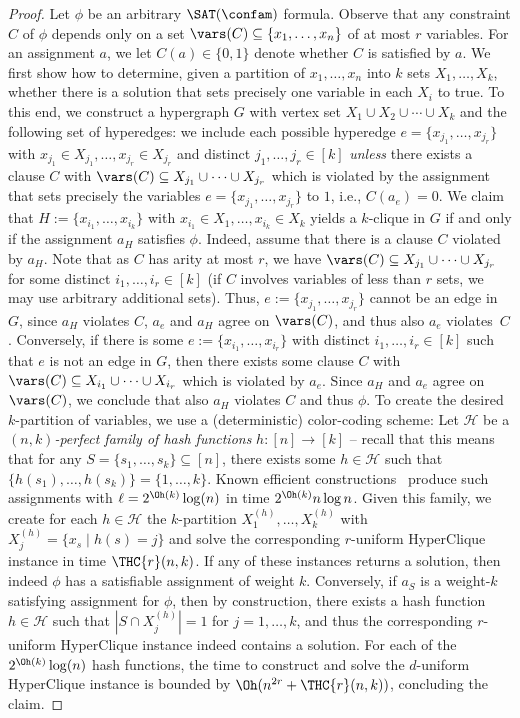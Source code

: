 \begin{proof}
Let $\phi$ be an arbitrary $\SAT(\confam)$ formula. Observe that any constraint $C$ of $\phi$ depends only on a set $\vars(C)\subseteq \{x_1,\dots,x_n\}$ of at most $r$ variables. For an assignment $a$, we let $C(a)\in \{0,1\}$ denote whether $C$ is satisfied by $a$.
%
We first show how to determine, given a partition of $x_1, \dots, x_n$ into $k$ sets $X_1,\dots, X_k$, whether there is a solution that sets precisely one variable in each $X_i$ to true. To this end, we construct a hypergraph $G$ with vertex set $X_1 \cup X_2 \cup \cdots \cup X_k$ and the following set of hyperedges: we include each possible hyperedge $e=\{x_{j_1}, \dots, x_{j_r}\}$ with $x_{j_1}\in X_{j_1}, \dots, x_{j_r} \in X_{j_r}$ and distinct $j_1, \dots, j_r\in [k]$ \emph{unless} there exists a clause $C$ with $\vars(C) \subseteq X_{j_1} \cup \cdots \cup X_{j_r}$ which is violated by the assignment that sets precisely the variables $e=\{x_{j_1}, \dots, x_{j_r}\}$ to $1$, i.e., $C(a_{e}) = 0$.
%
We claim that $H := \{x_{i_1}, \dots, x_{i_{k}}\}$ with  $x_{i_1} \in X_1, \dots, x_{i_k} \in X_k$ yields a $k$-clique in $G$ if and only if the assignment $a_{H}$ satisfies $\phi$. Indeed, assume that there is a clause $C$ violated by $a_{H}$. Note that as $C$ has arity at most $r$, we have $\vars(C) \subseteq X_{j_1} \cup \cdots \cup X_{j_r}$ for some distinct $i_1, \dots, i_r \in [k]$ (if $C$ involves variables of less than $r$ sets, we may use arbitrary additional sets). Thus, $e:=\{x_{j_1}, \dots, x_{j_r}\}$ cannot be an edge in $G$, since $a_H$ violates $C$, $a_e$ and $a_H$ agree on $\vars(C)$, and thus also $a_{e}$ violates~$C$. Conversely, if there is some $e:= \{x_{i_1}, \dots, x_{i_r}\}$ with distinct $i_1, \dots, i_r \in [k]$ such that $e$ is not an edge in $G$, then there exists some clause $C$ with $\vars(C) \subseteq X_{i_1} \cup \dots \cup X_{i_r}$ which is violated by $a_e$. Since $a_H$ and $a_e$ agree on $\vars(C)$, we conclude that also $a_H$ violates $C$ and thus $\phi$.
%
To create the desired $k$-partition of variables, we use a (deterministic) color-coding scheme: Let $\mathcal{H}$ be a \emph{$(n,k)$-perfect family of hash functions} $h : [n]\to [k]$ -- recall that this means that for any $S=\{s_1,\dots, s_k\}\subseteq [n]$, there exists some $h\in \mathcal{H}$ such that $\{h(s_1),\dots, h(s_k)\} = \{1,\dots, k\}$. Known efficient constructions~\cite{SchmidtS90, AlonYZ95} produce such assignments with $\ell = 2^{\Oh(k)}\log(n)$ in time $2^{\Oh(k)}n \log n$. Given this family, we create for each $h \in \mathcal{H}$ the $k$-partition $X^{(h)}_1, \dots, X^{(h)}_k$ with $X^{(h)}_j = \{ x_{s} \mid h(s) = j\}$ and solve the corresponding $r$-uniform HyperClique instance in time $\THC{r}(n,k)$. If any of these instances returns a solution, then indeed $\phi$ has a satisfiable assignment of weight $k$. Conversely, if $a_S$ is a weight-$k$ satisfying assignment for $\phi$, then by construction, there exists a hash function $h \in \mathcal{H}$ such that $|S\cap X^{(h)}_j|=1$ for $j=1,\dots, k$, and thus the corresponding $r$-uniform HyperClique instance indeed contains a solution. For each of the $2^{\Oh(k)}\log(n)$ hash functions, the time to construct and solve the $d$-uniform HyperClique instance is bounded by $\Oh(n^{2r} + \THC{r}(n,k))$, concluding the claim. 

\end{proof}
